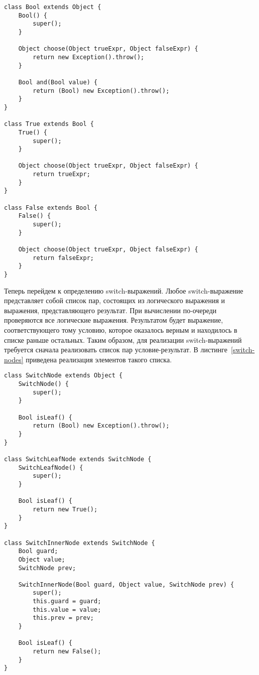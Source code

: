 \begin{lstlisting}[float=htb,label=bool,caption=Определение логического типа данных]
class Bool extends Object {
    Bool() {
        super();
    }

    Object choose(Object trueExpr, Object falseExpr) {
        return new Exception().throw();
    }

    Bool and(Bool value) {
        return (Bool) new Exception().throw();
    }
}

class True extends Bool {
    True() {
        super();
    }

    Object choose(Object trueExpr, Object falseExpr) {
        return trueExpr;
    }
}

class False extends Bool {
    False() {
        super();
    }

    Object choose(Object trueExpr, Object falseExpr) {
        return falseExpr;
    }
}
\end{lstlisting}
Теперь перейдем к определению switch-выражений. Любое switch-выражение представляет собой список пар, состоящих из логического выражения и выражения, представляющего результат.
При вычислении по-очереди проверяются все логические выражения. Результатом будет выражение, соответствующего тому условию, которое оказалось верным и находилось в списке раньше остальных.
Таким образом, для реализации switch-выражений требуется сначала реализовать список пар условие-результат. В листинге~\ref{switch-nodes} приведена реализация элементов такого списка.
\begin{lstlisting}[float=htb,label=switch-nodes,caption=Реализация элементов списка для switch-выражений]
class SwitchNode extends Object {
    SwitchNode() {
        super();
    }

    Bool isLeaf() {
        return (Bool) new Exception().throw();
    }
}

class SwitchLeafNode extends SwitchNode {
    SwitchLeafNode() {
        super();
    }

    Bool isLeaf() {
        return new True();
    }
}

class SwitchInnerNode extends SwitchNode {
    Bool guard;
    Object value;
    SwitchNode prev;

    SwitchInnerNode(Bool guard, Object value, SwitchNode prev) {
        super();
        this.guard = guard;
        this.value = value;
        this.prev = prev;
    }

    Bool isLeaf() {
        return new False();
    }
}
\end{lstlisting}

